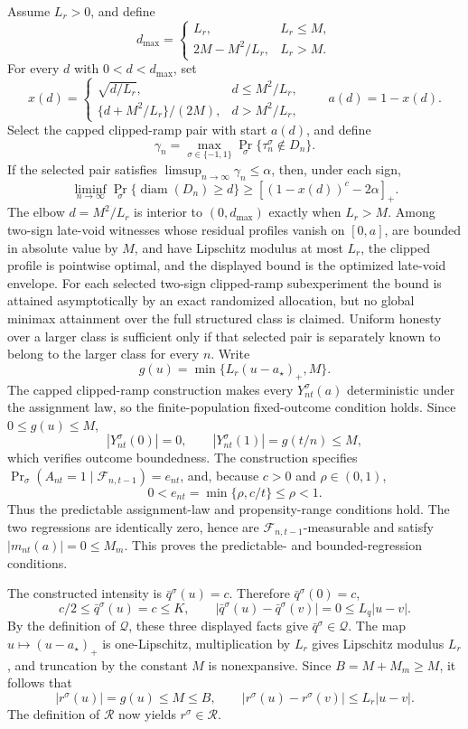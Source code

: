 Assume \(L_r>0\), and define
\[
 d_{\max}=\begin{cases}
 L_r,&L_r\le M,\\
 2M-M^2/L_r,&L_r>M.
 \end{cases}
\]
For every \(d\) with \(0<d<d_{\max}\), set
\[
 x(d)=\begin{cases}
 \sqrt{d/L_r},&d\le M^2/L_r,\\
 \{d+M^2/L_r\}/(2M),&d>M^2/L_r,
 \end{cases}
 \qquad a(d)=1-x(d).
\]
Select the capped clipped-ramp pair with start \(a(d)\), and define
\[
 \gamma_n=\max_{\sigma\in\{-1,1\}}
 \Pr_\sigma\{\tau_n^\sigma\notin D_n\}.
\]
If the selected pair satisfies \(\limsup_{n\to\infty}\gamma_n\le\alpha\), then, under each sign,
\[
 \liminf_{n\to\infty}
 \Pr_\sigma\{\operatorname{diam}(D_n)\ge d\}
 \ge[(1-x(d))^c-2\alpha]_+.
\]
The elbow \(d=M^2/L_r\) is interior to \((0,d_{\max})\) exactly when \(L_r>M\). Among two-sign late-void witnesses whose residual profiles vanish on \([0,a]\), are bounded in absolute value by \(M\), and have Lipschitz modulus at most \(L_r\), the clipped profile is pointwise optimal, and the displayed bound is the optimized late-void envelope. For each selected two-sign clipped-ramp subexperiment the bound is attained asymptotically by an exact randomized allocation, but no global minimax attainment over the full structured class is claimed. Uniform honesty over a larger class is sufficient only if that selected pair is separately known to belong to the larger class for every \(n\).
Write
\[
 g(u)=\min\{L_r(u-a_\star)_+,M\}.
\]
The capped clipped-ramp construction makes every \(Y_{nt}^\sigma(a)\) deterministic under the assignment law, so the finite-population fixed-outcome condition holds. Since \(0\le g(u)\le M\),
\[
 |Y_{nt}^\sigma(0)|=0,
 \qquad
 |Y_{nt}^\sigma(1)|=g(t/n)\le M,
\]
which verifies outcome boundedness. The construction specifies
\(\Pr_\sigma(A_{nt}=1\mid\mathcal F_{n,t-1})=e_{nt}\), and, because \(c>0\) and \(\rho\in(0,1)\),
\[
 0<e_{nt}=\min\{\rho,c/t\}\le\rho<1.
\]
Thus the predictable assignment-law and propensity-range conditions hold. The two regressions are identically zero, hence are \(\mathcal F_{n,t-1}\)-measurable and satisfy \(|m_{nt}(a)|=0\le M_m\). This proves the predictable- and bounded-regression conditions.

The constructed intensity is \(\bar q^\sigma(u)=c\). Therefore \(\bar q^\sigma(0)=c\),
\[
 c/2\le \bar q^\sigma(u)=c\le K,
 \qquad
 |\bar q^\sigma(u)-\bar q^\sigma(v)|=0\le L_q|u-v|.
\]
By the definition of \(\mathcal Q\), these three displayed facts give \(\bar q^\sigma\in\mathcal Q\). The map \(u\mapsto(u-a_\star)_+\) is one-Lipschitz, multiplication by \(L_r\) gives Lipschitz modulus \(L_r\), and truncation by the constant \(M\) is nonexpansive. Since \(B=M+M_m\ge M\), it follows that
\[
 |r^\sigma(u)|=g(u)\le M\le B,
 \qquad
 |r^\sigma(u)-r^\sigma(v)|\le L_r|u-v|.
\]
The definition of \(\mathcal R\) now yields \(r^\sigma\in\mathcal R\).

